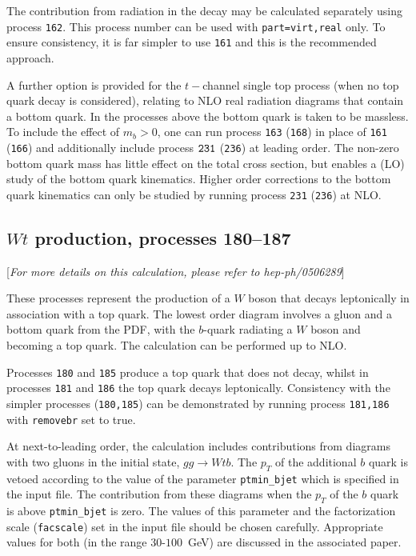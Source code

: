 \documentclass{article}
\begin{document}
{{{{{{The contribution from radiation in the decay may be calculated separately using
process {\tt 162}. This process number can be used with {\tt part=virt,real}
only. To ensure consistency, it is far simpler to use {\tt 161}
and this is the recommended approach.

A further option is provided for the $t-$channel single top process (when no
top quark decay is considered), relating to NLO real radiation diagrams that
contain a bottom quark. In the processes above the bottom quark is taken to
be massless. To include the effect of $m_b > 0$, one can run process
{\tt 163} ({\tt 168}) in place of {\tt 161} ({\tt 166}) and additionally include
process $\tt 231$ ({\tt 236}) at leading order.
The non-zero bottom quark mass has little effect on
the total cross section, but enables a (LO) study of the bottom quark kinematics.
Higher order corrections to the bottom quark kinematics can only be studied by running
process {\tt 231} ({\tt 236}) at NLO.

\subsection{$Wt$ production, processes 180--187}
\label{subsec:wt}

\begin{center}
[{\it For more details on this calculation, please refer to hep-ph/0506289}]
\end{center}

These processes represent the production of a $W$ boson that decays leptonically
in association with a top quark. The lowest order diagram involves a gluon and
a bottom quark from the PDF, with the $b$-quark radiating a $W$ boson and
becoming a top quark. The calculation can be performed up to NLO.

Processes {\tt 180} and {\tt 185} produce a top quark that does not decay,
whilst in processes {\tt 181} and {\tt 186} the top quark decays leptonically.
Consistency with
the simpler processes ({\tt 180,185}) can be demonstrated by running process
{\tt 181,186} with {\tt removebr} set to true.

At next-to-leading order, the calculation includes contributions from diagrams
with two gluons in the initial state, $gg \rightarrow Wtb$. The $p_T$ of the
additional $b$ quark is vetoed according to the value of the parameter
{\tt ptmin\_bjet} which is specified in the input file. The contribution from
these diagrams when the $p_T$ of the $b$ quark is above {\tt ptmin\_bjet}
is zero. The values of this parameter and the factorization scale ({\tt facscale})
set in the input file should be chosen carefully. Appropriate values for both
(in the range $30$-$100$~GeV) are discussed in the associated paper.

}}}}}}
\end{document}
